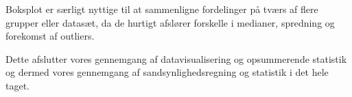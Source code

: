 Boksplot er særligt nyttige til at sammenligne fordelinger på tværs af flere grupper eller datasæt, da de hurtigt afslører forskelle i medianer, spredning og forekomst af outliers.

Dette afslutter vores gennemgang af datavisualisering og opsummerende statistik og dermed vores gennemgang af sandsynlighedsregning og statistik i det hele taget.
